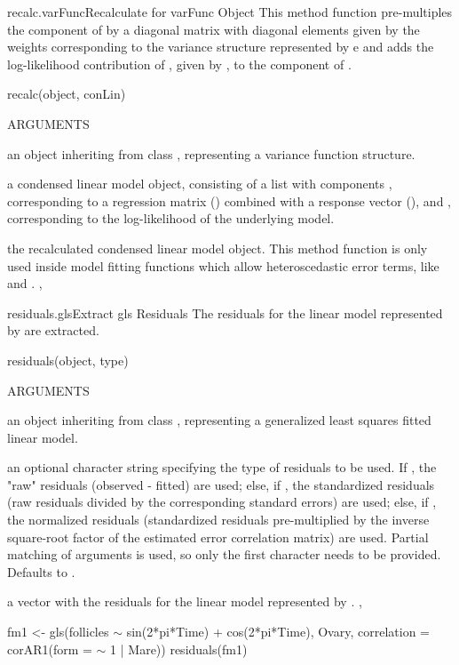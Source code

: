 \documentclass[pdftex]{article} \usepackage{url,graphicx}
\renewcommand{\Twiddle}{\mbox{\(\sim\)}}
\begin{document}
\begin{Helpfile}{recalc.varFunc}{Recalculate for varFunc Object}
This method function pre-multiples the  component of
 by a diagonal matrix with diagonal elements given by the
weights corresponding to the variance structure represented by
e and adds the log-likelihood contribution of
, given by , to the 
component of .
\begin{Example}
recalc(object, conLin)
\end{Example}
\begin{Argument}{ARGUMENTS}
\item[\Co{object:}]
an object inheriting from class ,
representing a variance function structure.
\item[\Co{conLin:}]
a condensed linear model object, consisting of a list
with components , corresponding to a regression matrix
() combined with a response vector (), and
, corresponding to the log-likelihood of the
underlying model.
\end{Argument}
the recalculated condensed linear model object.
 This method function is only used inside model fitting functions
which allow heteroscedastic error terms, like  and
.
, 
\end{Helpfile}
\begin{Helpfile}{residuals.gls}{Extract gls Residuals}
The residuals for the linear model represented by 
are extracted.
\begin{Example}
residuals(object, type)
\end{Example}
\begin{Argument}{ARGUMENTS}
\item[\Co{object:}]
an object inheriting from class , representing
a generalized least squares fitted linear model.
\item[\Co{type:}]
an optional character string specifying the type of
residuals to be used. If , the "raw" residuals
(observed - fitted) are used; else, if , the
standardized residuals (raw residuals divided by the corresponding
standard errors) are used; else, if , the
normalized residuals (standardized residuals pre-multiplied by the
inverse square-root factor of the estimated error correlation
matrix) are used. Partial matching of arguments is used, so only the
first character needs to be provided. Defaults to .
\end{Argument}
a vector with the residuals for the linear model represented by
.
, 
\need 15pt
\vspace{-16pt}
\begin{Example}
fm1 <- gls(follicles {\Twiddle} sin(2*pi*Time) + cos(2*pi*Time), Ovary,
           correlation = corAR1(form = {\Twiddle} 1 | Mare))
residuals(fm1)
\end{Example}
\end{Helpfile}
\end{document}
